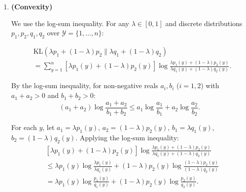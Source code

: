 \documentclass{article}
\begin{document}
{\begin{enumerate}
        where the cross terms vanish because $\mathbb{E}[x - \mu_0] = 0$.

        Therefore:
        \begin{align}
        \mathbb{E}_{x \sim \mathcal{N}_0}[\log p_1(x)]
        &= -\frac{d}{2}\log(2\pi) - \frac{1}{2}\log|\Sigma_1| - \frac{1}{2}\left[\mathrm{tr}(\Sigma_1^{-1}\Sigma_0) + (\mu_1-\mu_0)^T\Sigma_1^{-1}(\mu_1-\mu_0)\right]. \nonumber
        \end{align}

        Subtracting:
        \begin{align}
        \mathrm{KL}(\mathcal{N}_0 \| \mathcal{N}_1)
        &= -\frac{1}{2}\log|\Sigma_0| - \frac{d}{2} + \frac{1}{2}\log|\Sigma_1| + \frac{1}{2}\mathrm{tr}(\Sigma_1^{-1}\Sigma_0) + \frac{1}{2}(\mu_1-\mu_0)^T\Sigma_1^{-1}(\mu_1-\mu_0) \nonumber \\
        &= \frac{1}{2}\left(\mathrm{tr}(\Sigma_1^{-1}\Sigma_0) + (\mu_1-\mu_0)^T\Sigma_1^{-1}(\mu_1-\mu_0) - d + \log\frac{|\Sigma_1|}{|\Sigma_0|}\right). \nonumber
        \end{align}
        $\hfill\blacksquare$

        \item \textbf{(Convexity)}

        We use the log-sum inequality. For any $\lambda \in [0,1]$ and discrete distributions $p_1, p_2, q_1, q_2$ over $\mathcal{Y} = \{1,\ldots,n\}$:

        \begin{align}
        &\mathrm{KL}(\lambda p_1 + (1-\lambda)p_2 \| \lambda q_1 + (1-\lambda)q_2) \nonumber \\
        &= \sum_{y=1}^{n} \left[\lambda p_1(y) + (1-\lambda)p_2(y)\right] \log \frac{\lambda p_1(y) + (1-\lambda)p_2(y)}{\lambda q_1(y) + (1-\lambda)q_2(y)}. \nonumber
        \end{align}

        By the log-sum inequality, for non-negative reals $a_i, b_i$ ($i=1,2$) with $a_1 + a_2 > 0$ and $b_1 + b_2 > 0$:
        \[
        (a_1 + a_2) \log \frac{a_1 + a_2}{b_1 + b_2} \leq a_1 \log \frac{a_1}{b_1} + a_2 \log \frac{a_2}{b_2}.
        \]

        For each $y$, let $a_1 = \lambda p_1(y)$, $a_2 = (1-\lambda)p_2(y)$, $b_1 = \lambda q_1(y)$, $b_2 = (1-\lambda)q_2(y)$. Applying the log-sum inequality:
        \begin{align}
        &[\lambda p_1(y) + (1-\lambda)p_2(y)] \log \frac{\lambda p_1(y) + (1-\lambda)p_2(y)}{\lambda q_1(y) + (1-\lambda)q_2(y)} \nonumber \\
        &\leq \lambda p_1(y) \log \frac{\lambda p_1(y)}{\lambda q_1(y)} + (1-\lambda)p_2(y) \log \frac{(1-\lambda)p_2(y)}{(1-\lambda)q_2(y)} \nonumber \\
        &= \lambda p_1(y) \log \frac{p_1(y)}{q_1(y)} + (1-\lambda)p_2(y) \log \frac{p_2(y)}{q_2(y)}. \nonumber
        \end{align}


\end{enumerate}}
\end{document}
